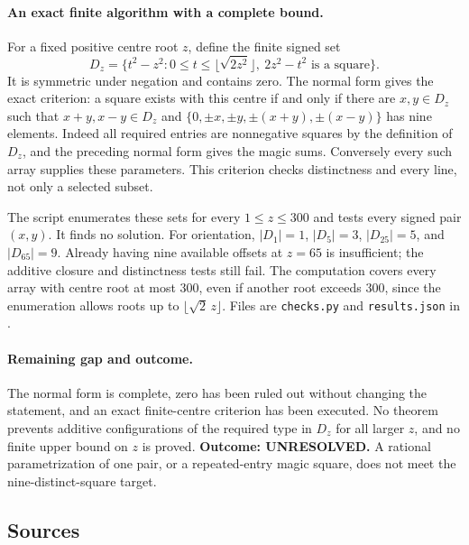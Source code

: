 \documentclass[11pt,a4paper]{article}
\begin{document}
\paragraph{An exact finite algorithm with a complete bound.}
For a fixed positive centre root $z$, define the finite signed set
\[
 D_z=\{t^2-z^2:0\le t\le\lfloor\sqrt{2z^2}\rfloor,
                       \ 2z^2-t^2\text{ is a square}\}.
\]
It is symmetric under negation and contains zero. The normal form gives
the exact criterion: a square exists with this centre if and only if
there are $x,y\in D_z$ such that $x+y,x-y\in D_z$ and
$\{0,\pm x,\pm y,\pm(x+y),\pm(x-y)\}$ has nine elements.
Indeed all required entries are nonnegative squares by the definition
of $D_z$, and the preceding normal form gives the magic sums.
Conversely every such array supplies these parameters. This criterion
checks distinctness and every line, not only a selected subset.

The script enumerates these sets for every $1\le z\le300$ and tests
every signed pair $(x,y)$. It finds no solution. For orientation,
$|D_1|=1$, $|D_5|=3$, $|D_{25}|=5$, and $|D_{65}|=9$.
Already having nine available offsets at $z=65$ is insufficient; the
additive closure and distinctness tests still fail. The computation
covers every array with centre root at most $300$, even if another
root exceeds $300$, since the enumeration allows roots up to
$\lfloor\sqrt2\,z\rfloor$. Files are \texttt{checks.py} and
\texttt{results.json} in
.

\paragraph{Remaining gap and outcome.}
The normal form is complete, zero has been ruled out without changing
the statement, and an exact finite-centre criterion has been executed.
No theorem prevents additive configurations of the required type in
$D_z$ for all larger $z$, and no finite upper bound on $z$ is proved.
\textbf{Outcome: UNRESOLVED.} A rational parametrization of one pair,
or a repeated-entry magic square, does not meet the nine-distinct-square
target.

\subsection{Sources}
\end{document}
